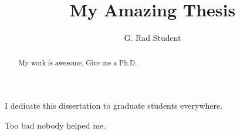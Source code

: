 \title{My Amazing Thesis}
\author{G. Rad Student} %
\prevdegrees{} %

\maketitle
\copyrightpage

\begin{abstract}
My work is awesome. Give me a Ph.D.
\end{abstract}

\begin{frontmatter}
\renewcommand{\thepage}{\roman{page}}
\setcounter{page}{1}

\begin{dedication}
\null\vfil
{\large
\begin{center}
I dedicate this dissertation to graduate students everywhere.
\end{center}}
\null\vfil
\end{dedication}

\tableofcontents
\listoffigures %
\listoftables %


\begin{acknowledgements}
Too bad nobody helped me.
\end{acknowledgements}

\clearpage

\end{frontmatter}
